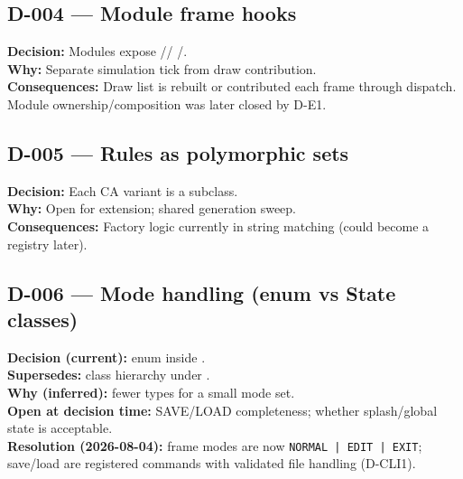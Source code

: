 \subsection*{D-004 --- Module frame hooks}
\begin{decisionbox}[title={D-004 \quad inferred from IModule}]
\textbf{Decision:} Modules expose //
/.\\
\textbf{Why:} Separate simulation tick from draw contribution.\\
\textbf{Consequences:} Draw list is rebuilt or contributed each frame through
dispatch. Module ownership/composition was later closed by D-E1.
\end{decisionbox}

\subsection*{D-005 --- Rules as polymorphic sets}
\begin{decisionbox}[title={D-005 \quad inferred}]
\textbf{Decision:} Each CA variant is a  subclass.\\
\textbf{Why:} Open for extension; shared generation sweep.\\
\textbf{Consequences:} Factory logic currently in 
string matching (could become a registry later).
\end{decisionbox}

\subsection*{D-006 --- Mode handling (enum vs State classes)}
\begin{decisionbox}[title={D-006 \quad current code; author may supersede}]
\textbf{Decision (current):}  enum inside
.\\
\textbf{Supersedes:} class hierarchy under .\\
\textbf{Why (inferred):} fewer types for a small mode set.\\
\textbf{Open at decision time:} SAVE/LOAD completeness; whether splash/global
state is acceptable.\\
\textbf{Resolution (2026-08-04):} frame modes are now
\texttt{NORMAL | EDIT | EXIT}; save/load are registered commands with validated
file handling (D-CLI1).
\end{decisionbox}


